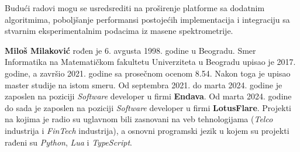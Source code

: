\documentclass[12pt,oneside]{memoir}
\begin{document}
Budući radovi mogu se usredsrediti na proširenje platforme sa dodatnim algoritmima, poboljšanje performansi postojećih implementacija i integraciju sa stvarnim eksperimentalnim podacima iz masene spektrometrije.

\literatura

\backmatter

\begin{biografija}
  \textbf{Miloš Milaković} rođen je 6. avgusta 1998. godine u Beogradu. Smer Informatika na Matematičkom fakultetu Univerziteta u Beogradu upisao je 2017. godine, a završio 2021. godine sa prosečnom ocenom 8.54. Nakon toga je upisao master studije na istom smeru. 
  Od septembra 2021. do marta 2024. godine je zaposlen na poziciji \emph{Software} developer u firmi \textbf{Endava}. Od marta 2024. godine do sada je zaposlen na poziciji \emph{Software} developer u firmi \textbf{LotusFlare}. Projekti na kojima je radio su uglavnom bili zasnovani na veb tehnologijama (\emph{Telco} industrija i \emph{FinTech} industrija), a osnovni programski jezik u kojem su projekti rađeni su \emph{Python}, \emph{Lua} i \emph{TypeScript}.
\end{biografija}
\end{document}
